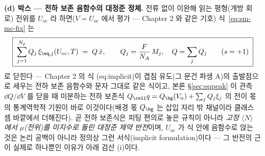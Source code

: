 \textbf{(d) 박스 --- 전하 보존 음함수의 대정준 정체.} 전류 없이 이완해 읽는 평형(개방 회로) 전위를
$U_\mathrm{oc}$ 라 하면($V=U_\mathrm{oc}$ 에서 평가 --- Chapter 2 와 같은 기호) 식~\eqref{eq:sm-mc-fix} 는
\begin{equation}
\boxed{\;\sum_{j=1}^{N_p}Q_j\,\xi_{\eq,j}(U_\mathrm{oc},T)\;=\;Q\,\bar x,
\qquad Q_j=\frac{F}{N_A}\,M_j,\quad Q=\sum_jQ_j\qquad(s=+1)\;}
\label{eq:sm-mc-balance}
\end{equation}
로 닫힌다 --- Chapter 2 의 식 (eq:implicit)이 겹침 유도(그 문건 파생 A)의 출발점으로 세우는 전하 보존
음함수와 문자 그대로 같은 식이고, 본론 \S\ref{sec:eqpeak} 이 관측 $\dd Q/\dd V$ 를 닫을 때 미분하는 전하
보존식 $Q_\cell q=Q_\bg(V_n)+\sum_jQ_j\xi_j$ 의 전이 몫의 통계역학적 기원이 바로 이것이다(배경 몫
$Q_\bg$ 는 삽입 자리 밖 채널이라 클래스 셈 바깥에서 더해진다). 곧 전하 보존식은 피팅 편의로 놓은 규칙이
아니라 \emph{고정 $\langle N\rangle$ 에서 $\mu$(전위)를 미지수로 돌린 대정준 제약 반전}이며,
$U_\mathrm{oc}$ 가 식 안에 음함수로 앉는 것은 논리 공백이 아니라 정의상 그런 서식(implicit formulation)이다
--- 그 반전의 근이 실제로 하나뿐인 이유가 아래 검산 (i)이다.
